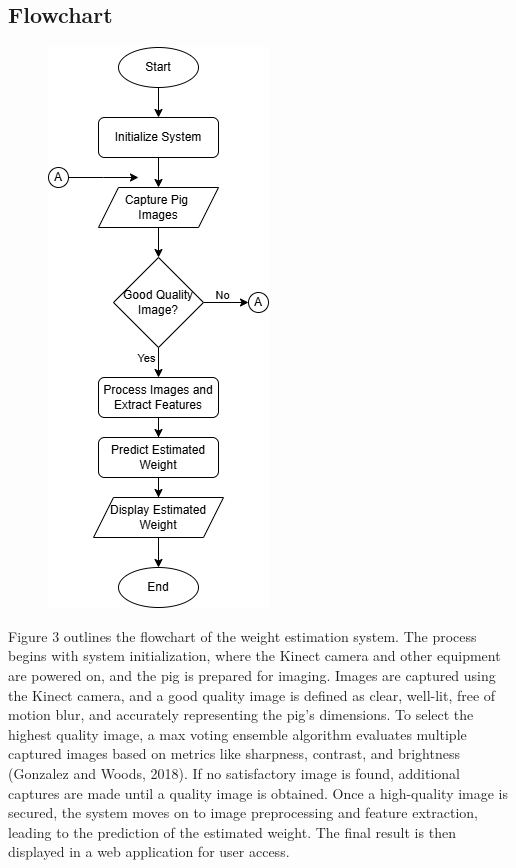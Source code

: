 {\subsection {Flowchart}
\begin{figure}[h]
	\centering
	\includegraphics[height=0.6\textheight]{figures/kinectpigNIGGA}
	\caption{}
	\label{fig:Flowchart}
\end{figure}

Figure 3 outlines the flowchart of the weight estimation system. The process begins with system initialization, where the Kinect camera and other equipment are powered on, and the pig is prepared for imaging. Images are captured using the Kinect camera, and a good quality image is defined as clear, well-lit, free of motion blur, and accurately representing the pig's dimensions. To select the highest quality image, a max voting ensemble algorithm evaluates multiple captured images based on metrics like sharpness, contrast, and brightness (Gonzalez and Woods, 2018). If no satisfactory image is found, additional captures are made until a quality image is obtained. Once a high-quality image is secured, the system moves on to image preprocessing and feature extraction, leading to the prediction of the estimated weight. The final result is then displayed in a web application for user access.
}
